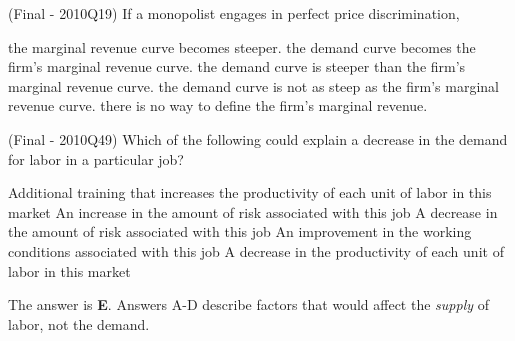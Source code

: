 \documentclass{exam}
\begin{document}
\begin{questions}
\question (Final - 2010Q19) If a monopolist engages in perfect price discrimination,
\begin{choices}
\choice the marginal revenue curve becomes steeper.
\CorrectChoice the demand curve becomes  the firm's marginal revenue curve.
\choice the demand curve is steeper than the firm's marginal revenue curve.
\choice the demand curve is not as steep as the firm's marginal revenue curve.
\choice there is no way to define the firm's marginal revenue.
\end{choices}

\question (Final - 2010Q49) Which of the following could explain a decrease in the demand for labor in a particular job?
\begin{choices}
\choice Additional training that increases the productivity of each unit of labor in this market 
\choice An increase in the amount of risk associated with this job 
\choice A decrease in the amount of risk associated with this job 
\choice An improvement in the working conditions associated with this job 
\CorrectChoice A decrease in the productivity of each unit of labor in this market 
\end{choices}

\begin{solution} The answer is \textbf{E}. Answers A-D describe factors that would affect the \textit{supply} of labor, not the demand. \end{solution}

\end{questions}
\end{document}
